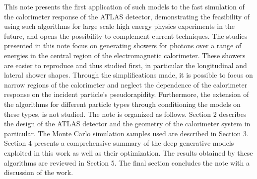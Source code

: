This note presents the first application of such models to the fast simulation of the calorimeter response of the ATLAS detector, demonstrating the feasibility of using such algorithms for large scale high energy physics experiments in the future, and opens the possibility to complement current techniques. The studies presented in this note focus on generating showers for photons over a range of energies in the central region of the electromagnetic calorimeter. These showers are easier to reproduce and thus studied first, in particular the longitudinal and lateral shower shapes. Through the simplifications made, it is possible to focus on narrow regions of the calorimeter and neglect the dependence of the calorimeter response on the incident particle’s pseudorapidity. Furthermore, the extension of the algorithms for different particle types through conditioning the models on these types, is not studied.
The note is organized as follows. Section 2 describes the design of the ATLAS detector and the geometry of the calorimeter system in particular. The Monte Carlo simulation samples used are described in Section 3. Section 4 presents a comprehensive summary of the deep generative models exploited in this work as well as their optimization. The results obtained by these algorithms are reviewed in Section 5. The final section concludes the note with a discussion of the work.


%
